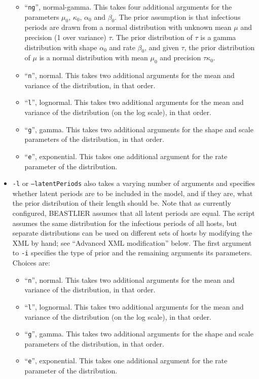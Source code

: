 \documentclass[]{article}
\begin{document}
\begin{itemize}
{\begin{itemize}
		\item {``{\tt ng}'', normal-gamma. This takes four additional arguments for the parameters $\mu_0$, $\kappa_0$, $\alpha_0$ and $\beta_0$. The prior assumption is that infectious periods are drawn from a normal distribution with unknown mean $\mu$ and precision (1 over variance) $\tau$. The prior distribution of $\tau$ is a gamma distribution with shape $\alpha_0$ and rate $\beta_0$, and given $\tau$, the prior distribution of $\mu$ is a normal distribution with mean $\mu_0$ and precision $\tau\kappa_0$.}
		\item {``{\tt n}'', normal. This takes two additional arguments for the mean and variance of the distribution, in that order.}
		\item {``{\tt l}'', lognormal. This takes two additional arguments for the mean and variance of the distribution (on the log scale), in that order.}
		\item {``{\tt g}'', gamma. This takes two additional arguments for the shape and scale parameters of the distribution, in that order.}
		\item {``{\tt e}'', exponential. This takes one additional argument for the rate parameter of the distribution.}
	\end{itemize}
	} 
\item{{\tt-l} or {\tt --latentPeriods} also takes a varying number of arguments and specifies whether latent periods are to be included in the model, and if they are, what the prior distribution of their length should be. Note that as currently configured, BEASTLIER assumes that all latent periods are equal. The script assumes the same distribution for the infectious periods of all hosts, but separate distributions can be used on different sets of hosts by modifying the XML by hand; see ``Advanced XML modification'' below. The first argument to {\tt-i} specifies the type of prior and the remaining arguments its parameters. Choices are:
	\begin{itemize}
		\item {``{\tt n}'', normal. This takes two additional arguments for the mean and variance of the distribution, in that order.}
		\item {``{\tt l}'', lognormal. This takes two additional arguments for the mean and variance of the distribution (on the log scale), in that order.}
		\item {``{\tt g}'', gamma. This takes two additional arguments for the shape and scale parameters of the distribution, in that order.}
		\item {``{\tt e}'', exponential. This takes one additional argument for the rate parameter of the distribution.}

\end{itemize}}
\end{itemize}
\end{document}
